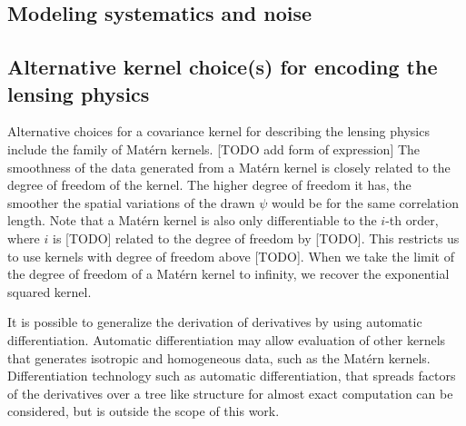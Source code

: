 \subsection{Modeling systematics and noise}

\subsection{Alternative kernel choice(s) for encoding the lensing physics}
Alternative choices for a covariance kernel for describing the lensing physics 
include the family of Mat\'{e}rn kernels.
[TODO add form of expression] 
The smoothness of the data generated from a Mat\'{e}rn kernel is closely
related to the degree of freedom of the kernel. 
The higher degree of freedom it has, the smoother the spatial variations of the
drawn $\psi$ would be for the same correlation length.
Note that a Mat\'{e}rn kernel is also only differentiable to the $i$-th order,
where $i$ is [TODO] related to the degree of freedom by [TODO].
This restricts us to use kernels with degree of freedom above [TODO]. 
When we take the limit of the degree of freedom of a Mat\'{e}rn kernel to infinity, 
we recover the exponential squared kernel.

It is possible to generalize the derivation of derivatives by using automatic
differentiation. Automatic differentiation may allow evaluation of other
kernels that generates isotropic and homogeneous data, 
such as the Mat\'{e}rn kernels.  
Differentiation technology such as automatic differentiation, 
that spreads factors of the derivatives over a tree like structure for
almost exact computation can be considered, but is outside the scope of this work.

